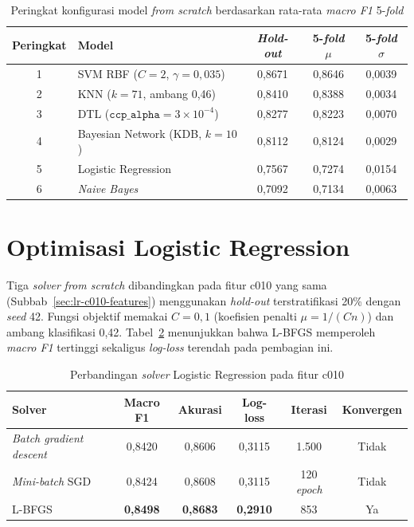 \begin{table}[H]
	\centering
	\caption{Peringkat konfigurasi model \textit{from scratch} berdasarkan rata-rata \textit{macro F1} 5-\textit{fold}}
	\label{tab:ranking-model}
	\small
	\begin{tabular}{c l c c c}
		\toprule
		\textbf{Peringkat} & \textbf{Model} & \textbf{\textit{Hold-out}} & \textbf{5-\textit{fold} $\mu$} & \textbf{5-\textit{fold} $\sigma$} \\
		\midrule
		1 & SVM RBF ($C=2$, $\gamma=0{,}035$) & 0,8671 & 0,8646 & 0,0039 \\
		2 & KNN ($k=71$, ambang 0,46) & 0,8410 & 0,8388 & 0,0034 \\
		3 & DTL ($\texttt{ccp\_alpha}=3\times10^{-4}$) & 0,8277 & 0,8223 & 0,0070 \\
		4 & Bayesian Network (KDB, $k=10$) & 0,8112 & 0,8124 & 0,0029 \\
		5 & Logistic Regression & 0,7567 & 0,7274 & 0,0154 \\
		6 & \textit{Naive Bayes} & 0,7092 & 0,7134 & 0,0063 \\
		\bottomrule
	\end{tabular}
\end{table}

\section{Optimisasi Logistic Regression}
\label{sec:hasil-lr-solver}

Tiga \textit{solver} \textit{from scratch} dibandingkan pada fitur c010 yang
sama (Subbab~\ref{sec:lr-c010-features}) menggunakan \textit{hold-out}
terstratifikasi 20\% dengan \textit{seed} 42. Fungsi objektif memakai
$C=0{,}1$ (koefisien penalti $\mu=1/(Cn)$) dan ambang klasifikasi 0,42.
Tabel~\ref{tab:lr-solvers} menunjukkan bahwa L-BFGS memperoleh \textit{macro F1}
tertinggi sekaligus \textit{log-loss} terendah pada pembagian ini.

\begin{table}[H]
\centering
\caption{Perbandingan \textit{solver} Logistic Regression pada fitur c010}
\label{tab:lr-solvers}
\small
\begin{tabular}{l c c c c c}
\toprule
\textbf{Solver} & \textbf{Macro F1} & \textbf{Akurasi} & \textbf{Log-loss} & \textbf{Iterasi} & \textbf{Konvergen} \\
\midrule
\textit{Batch gradient descent} & 0,8420 & 0,8606 & 0,3115 & 1.500 & Tidak \\
\textit{Mini-batch} SGD & 0,8424 & 0,8608 & 0,3115 & 120 \textit{epoch} & Tidak \\
L-BFGS & \textbf{0,8498} & \textbf{0,8683} & \textbf{0,2910} & 853 & Ya \\
\bottomrule
\end{tabular}
\end{table}

